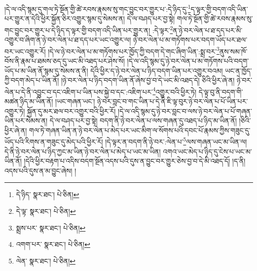 །དེ་ལ་འདི་སྙམ་དུ་གལ་ཏེ་སྔོན་གྱི་ཚེ་རབས་རྣམས་སུ་གང་བྱུང་བར་གྱུར་པ་:དེ་ཉིད་དུ་\footnote{དེ་ཉིད་  སྣར་ཐང་།  པེ་ཅིན། }ད་ལྟར་གྱི་བདག་འདི་ཡིན་པར་གྱུར་ན་དེའི་ཕྱིར་སྐྱོན་ཅིར་འགྱུར་སྙམ་དུ་སེམས་ན། དེ་ལ་བཤད་པར་བྱ་སྟེ། གལ་ཏེ་སྔོན་གྱི་ཚེ་རབས་རྣམས་སུ་གང་བྱུང་བར་གྱུར་པ་དེ་ཉིད་ད་ལྟར་གྱི་བདག་འདི་ཡིན་པར་གྱུར་ན། :དེ་ལྟར་\footnote{དེ་ལྟ་  སྣར་ཐང་།  པེ་ཅིན། }ན་ཉེ་བར་ལེན་པ་ཐ་དད་པར་མི་འགྱུར་བ་ཞིག་ན་ཉེ་བར་ལེན་པ་ཐ་དད་པར་ཡང་འགྱུར་ལ། ཉེ་བར་ལེན་པ་མ་གཏོགས་པར་བདག་ཡོད་པར་ཐལ་བར་ཡང་འགྱུར་རོ། །དེ་ལ་ཉེ་བར་ལེན་པ་མ་གཏོགས་པར་ཁྱོད་ཀྱི་བདག་དེ་གང་ཞིག་ཡིན་:སྨྲ་བར་\footnote{སྨྲས་པར་  སྣར་ཐང་།  པེ་ཅིན། }ནུས་སམ་ཁོ་བོས་ནི་རྣམ་པ་ཐམས་ཅད་དུ་ཡང་མི་འཐད་པར་ཤེས་སོ། །དེ་ལ་འདི་སྙམ་དུ་ཉེ་བར་ལེན་པ་མ་གཏོགས་པའི་བདག་ཡོད་པ་མ་ཡིན་ནོ་སྙམ་དུ་སེམས་ན་ནི། དེའི་ཕྱིར་ད་ཉེ་བར་ལེན་པ་ཉིད་བདག་ཡིན་པར་འགྱུར་བའམ། ཡང་ན་ཁྱོད་ཀྱི་བདག་མེད་པ་ཡིན་ནོ། །ཉེ་བར་ལེན་པ་ཉིད་བདག་ཡིན་ནོ་ཞེས་བྱ་བ་དེ་ཡང་མི་འཐད་དེ། ཅིའི་ཕྱིར་ཞེ་ན། ཉེ་བར་ལེན་པ་དེ་ནི་འབྱུང་བ་དང་འཇིག་པ་ཡིན་པས་སྐྱེ་བ་དང་:འཇིག་པར་\footnote{འགག་པར་  སྣར་ཐང་།  པེ་ཅིན། }འགྱུར་བའི་ཕྱིར་ཏེ། དེ་ལྟ་བུ་ནི་བདག་གི་མཚན་ཉིད་མ་ཡིན་ནོ། །ཡང་གཞན་ཡང་། ཉེ་བར་བླང་བ་གང་ཡིན་པ་དེ་ནི་ཇི་ལྟ་བུར་ཉེ་བར་ལེན་པ་པོ་ཡིན་པར་འགྱུར་ཏེ། སྐྱོན་དུ་མར་ཐལ་བར་འགྱུར་བའི་ཕྱིར་རོ། །དེ་ལ་འདི་སྙམ་དུ་ཉེ་བར་བླང་བ་ལས་ཉེ་བར་ལེན་པ་པོ་གཞན་ཡིན་པར་སེམས་ན། དེ་ལ་བཤད་པར་བྱ་སྟེ། བདག་ནི་ཉེ་བར་ལེན་པ་ལས་གཞན་དུ་འཐད་པ་ཉིད་མ་ཡིན་ནོ། །ཅིའི་ཕྱིར་ཞེ་ན། གལ་ཏེ་གཞན་ཡིན་ན་ཉེ་བར་ལེན་པ་མེད་པར་ཡང་མིག་ལ་སོགས་པའི་དབང་པོ་རྣམས་ཀྱིས་གཟུང་དུ་ཡོད་པའི་རིགས་ན་གཟུང་དུ་མེད་པའི་ཕྱིར་རོ། །དེ་ལྟར་ན་བདག་ནི་ཉེ་བར་:ལེན་པ་\footnote{ལེན་  སྣར་ཐང་།  པེ་ཅིན། }ལས་གཞན་ཡང་མ་ཡིན་ལ། དེ་ནི་ཉེ་བར་ལེན་པ་ཉིད་ཀྱང་མ་ཡིན་ཉེ་བར་ལེན་པ་མེད་པ་ཡང་མ་ཡིན། འགའ་ཡང་མེད་པ་ཉིད་དུ་ངེས་པ་ཡང་མ་ཡིན་ནོ། །དེའི་ཕྱིར་བརྟག་པ་འདིས་བདག་སྔོན་འདས་པའི་དུས་ན་བྱུང་བར་གྱུར་ཅེས་བྱ་བ་དེ་མི་འཐད་དོ། །ད་ནི། འདས་པའི་དུས་ན་མ་བྱུང་ཞེས། །
